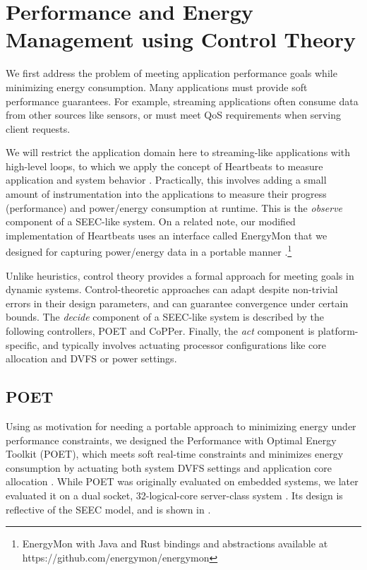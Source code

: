 \section{Performance and Energy Management using Control Theory}

We first address the problem of meeting application performance goals while minimizing energy consumption.
Many applications must provide soft performance guarantees.
For example, streaming applications often consume data from other sources like sensors, or must meet QoS requirements when serving client requests.

We will restrict the application domain here to streaming-like applications with high-level loops, to which we apply the concept of Heartbeats to measure application and system behavior \cite{icac2010heartbeats}.
Practically, this involves adding a small amount of instrumentation into the applications to measure their progress (performance) and power/energy consumption at runtime.
This is the \emph{observe} component of a SEEC-like system.
On a related note, our modified implementation of Heartbeats uses an interface called EnergyMon that we designed for capturing power/energy data in a portable manner \cite{energymon}.\footnote{EnergyMon with Java and Rust bindings and abstractions available at https://github.com/energymon/energymon}

Unlike heuristics, control theory provides a formal approach for meeting goals in dynamic systems.
Control-theoretic approaches can adapt despite non-trivial errors in their design parameters, and can guarantee convergence under certain bounds.
The \emph{decide} component of a SEEC-like system is described by the following controllers, POET and CoPPer.
Finally, the \emph{act} component is platform-specific, and typically involves actuating processor configurations like core allocation and DVFS or power settings.


\subsection{POET}

Using \cite{Imes2014} as motivation for needing a portable approach to minimizing energy under performance constraints, we designed the Performance with Optimal Energy Toolkit (POET), which meets soft real-time constraints and minimizes energy consumption by actuating both system DVFS settings and application core allocation \cite{POET}.
While POET was originally evaluated on embedded systems, we later evaluated it on a dual socket, 32-logical-core server-class system \cite{POETMCSoC}.
Its design is reflective of the SEEC model, and is shown in .

